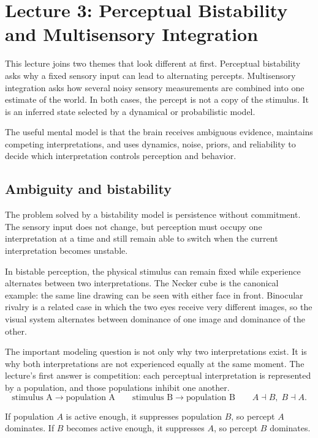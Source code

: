 \section{Lecture 3: Perceptual Bistability and Multisensory Integration}

This lecture joins two themes that look different at first. Perceptual bistability asks why a fixed sensory input can lead to alternating percepts. Multisensory integration asks how several noisy sensory measurements are combined into one estimate of the world. In both cases, the percept is not a copy of the stimulus. It is an inferred state selected by a dynamical or probabilistic model.

The useful mental model is that the brain receives ambiguous evidence, maintains competing interpretations, and uses dynamics, noise, priors, and reliability to decide which interpretation controls perception and behavior.

\subsection{Ambiguity and bistability}

The problem solved by a bistability model is persistence without commitment. The sensory input does not change, but perception must occupy one interpretation at a time and still remain able to switch when the current interpretation becomes unstable.

In bistable perception, the physical stimulus can remain fixed while experience alternates between two interpretations. The Necker cube is the canonical example: the same line drawing can be seen with either face in front. Binocular rivalry is a related case in which the two eyes receive very different images, so the visual system alternates between dominance of one image and dominance of the other.

The important modeling question is not only why two interpretations exist. It is why both interpretations are not experienced equally at the same moment. The lecture's first answer is competition: each perceptual interpretation is represented by a population, and those populations inhibit one another.
\[
\text{stimulus A} \rightarrow \text{population A}
\qquad
\text{stimulus B} \rightarrow \text{population B}
\qquad
A \dashv B,\; B \dashv A .
\]

If population \(A\) is active enough, it suppresses population \(B\), so percept \(A\) dominates. If \(B\) becomes active enough, it suppresses \(A\), so percept \(B\) dominates.

